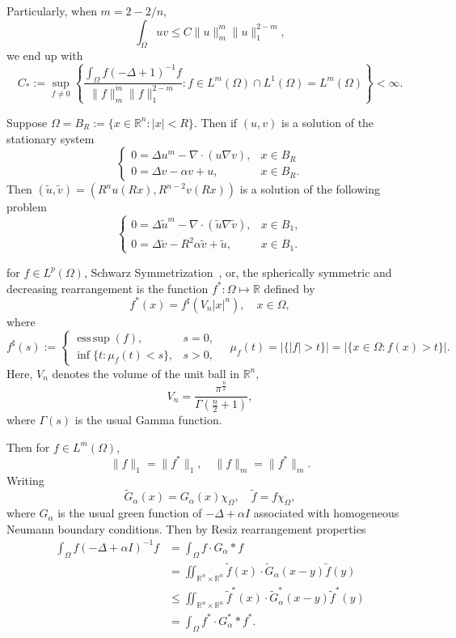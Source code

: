 \documentclass[en,hazy,screen,blue,14pt]{elegantnote}
\numberwithin{dummy}{section}
\DeclareMathOperator*{\esssup}{ess\,sup}
\begin{document}
Particularly, when $m=2-2/n$,
\[
	\int_\Omega uv \leq C\|u\|_m^m \|u\|_1^{2-m},
\]
we end up with 
\begin{equation}
	C_\ast := \sup_{f\neq0}\left\{\frac{\int_\Omega f(-\Delta+1)^{-1}f}{\|f\|_m^m\|f\|_1^{2-m}}: f\in L^m(\Omega)\cap L^1(\Omega) = L^m(\Omega)\right\} < \infty.
\end{equation}

Suppose $\Omega = B_R := \{x\in\mathbb{R}^n: |x|<R\}$. 
Then if $(u,v)$ is a solution of the stationary system
\begin{equation}
	\begin{cases}
		0 = \Delta u^m - \nabla\cdot(u\nabla v), & x\in B_R\\
		0 = \Delta v - \alpha v + u, & x\in B_R.
	\end{cases}
\end{equation}
Then $(\tilde{u}, \tilde{v}) = (R^nu(Rx), R^{n-2}v(Rx))$ is a solution of the following problem
\begin{equation*}
	\begin{cases}
		0 = \Delta \tilde{u}^m - \nabla\cdot(\tilde u\nabla \tilde v), & x\in B_1,\\
		0 = \Delta \tilde v - R^2\alpha \tilde v + \tilde u, & x\in B_1.
	\end{cases}
\end{equation*}

for $f\in L^p(\Omega)$, Schwarz Symmetrization~\cite{Kesavan2006}, or, the spherically symmetric and decreasing rearrangement is the function $f^*: \Omega \mapsto \mathbb{R}$ defined by 
\[
	f^\ast(x) = f^\sharp (V_n |x|^n),\quad x\in\Omega,
\]
where
\begin{equation*}
	f^\sharp(s) := 
	\begin{cases}
		\esssup(f),& s=0,\\
		\inf\{t:\mu_f(t) <s\}, & s>0,
	\end{cases}
	\quad \mu_f(t) = |\{|f|>t\}| = |\{x\in\Omega: f(x)>t\}|.
\end{equation*}
Here, $V_n$ denotes the volume of the unit ball in $\mathbb{R}^n$,
\[
	V_n=\frac{\pi^{\frac{n}{2}}}{\Gamma\left(\frac{n}{2}+1\right)},
\]
where $\Gamma(s)$ is the usual Gamma function.

Then for $f\in L^m(\Omega)$, 
\[
	\|f\|_1 = \|f^*\|_1, \quad \|f\|_m = \|f^*\|_m.
\]
Writing
\[
	\tilde G_\alpha(x) = G_\alpha(x)\chi_\Omega,\quad \tilde f = f\chi_\Omega, 
\]
where $G_\alpha$ is the usual green function of $-\Delta + \alpha I$ associated with homogeneous Neumann boundary conditions.
Then by Resiz rearrangement properties \cite[Lemma~2.1]{Lieb1983}
\begin{align*}
	\int_\Omega f(-\Delta + \alpha I)^{-1}f 
		&= \int_\Omega f \cdot G_\alpha * f\\
		&= \iint_{\mathbb{R}^n\times\mathbb{R}^n} \tilde{f}(x)\cdot\tilde{G}_\alpha(x-y)\tilde{f}(y)\\
		&\leq \iint_{\mathbb{R}^n\times\mathbb{R}^n} \tilde{f}^\ast(x)\cdot\tilde{G}^\ast_\alpha(x-y)\tilde{f}^\ast(y)\\
		&= \int_\Omega f^\ast\cdot G_\alpha^\ast*f^\ast.
\end{align*}
\end{document}
